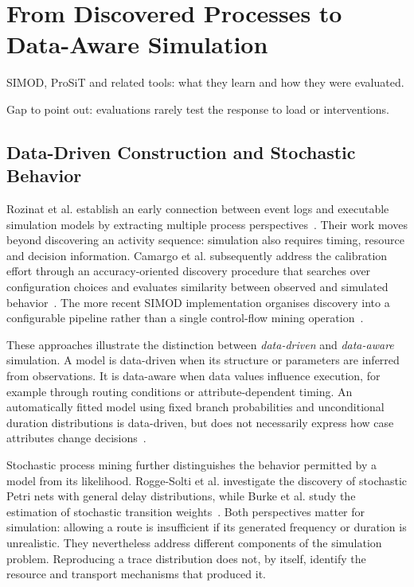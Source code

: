 \section{From Discovered Processes to Data-Aware Simulation}
\label{sec:rw_data_aware}
\begin{hints}
\item SIMOD, ProSiT and related tools: what they learn and how they were evaluated.
\item Gap to point out: evaluations rarely test the response to load or interventions.
\end{hints}

\subsection{Data-Driven Construction and Stochastic Behavior}

Rozinat et al. establish an early connection between event logs and executable simulation models by extracting multiple process perspectives~\cite{PMRozinat2009}. Their work moves beyond discovering an activity sequence: simulation also requires timing, resource and decision information. Camargo et al. subsequently address the calibration effort through an accuracy-oriented discovery procedure that searches over configuration choices and evaluates similarity between observed and simulated behavior~\cite{Camargo2020}. The more recent SIMOD implementation organises discovery into a configurable pipeline rather than a single control-flow mining operation~\cite{simod2024}.

These approaches illustrate the distinction between \emph{data-driven} and \emph{data-aware} simulation. A model is data-driven when its structure or parameters are inferred from observations. It is data-aware when data values influence execution, for example through routing conditions or attribute-dependent timing. An automatically fitted model using fixed branch probabilities and unconditional duration distributions is data-driven, but does not necessarily express how case attributes change decisions~\cite{lopez2024}.

Stochastic process mining further distinguishes the behavior permitted by a model from its likelihood. Rogge-Solti et al. investigate the discovery of stochastic Petri nets with general delay distributions, while Burke et al. study the estimation of stochastic transition weights~\cite{stochastikPetriNets2013Solti,burke2020stochasticPD}. Both perspectives matter for simulation: allowing a route is insufficient if its generated frequency or duration is unrealistic. They nevertheless address different components of the simulation problem. Reproducing a trace distribution does not, by itself, identify the resource and transport mechanisms that produced it.

